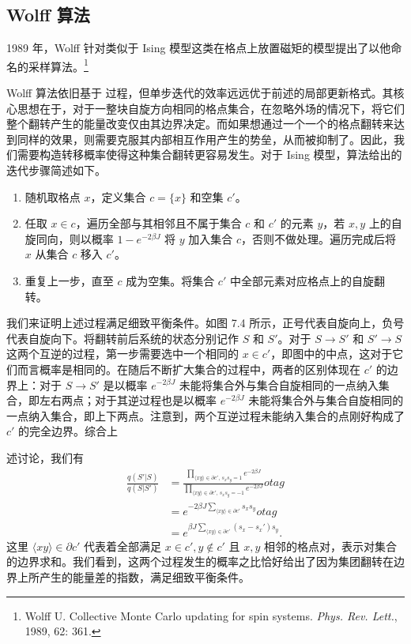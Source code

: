 \subsection{Wolff 算法}

1989 年，Wolff 针对类似于 Ising 模型这类在格点上放置磁矩的模型提出了以他命名的采样算法。\footnote{Wolff U. Collective Monte Carlo updating for spin systems. \emph{Phys. Rev. Lett.}, 1989, 62: 361.}

Wolff 算法依旧基于  过程，但单步迭代的效率远远优于前述的局部更新格式。其核心思想在于，对于一整块自旋方向相同的格点集合，在忽略外场的情况下，将它们整个翻转产生的能量改变仅由其边界决定。而如果想通过一个一个的格点翻转来达到同样的效果，则需要克服其内部相互作用产生的势垒，从而被抑制了。因此，我们需要构造转移概率使得这种集合翻转更容易发生。对于 Ising 模型，算法给出的迭代步骤简述如下。

\begin{algorithmBox}
\begin{enumerate}[label=\arabic*.,leftmargin=2em]
\item 随机取格点 $x$，定义集合 $c=\{x\}$ 和空集 $c'$。
\item 任取 $x\in c$，遍历全部与其相邻且不属于集合 $c$ 和 $c'$ 的元素 $y$，若 $x,y$ 上的自旋同向，则以概率 $1-e^{-2\beta J}$ 将 $y$ 加入集合 $c$，否则不做处理。遍历完成后将 $x$ 从集合 $c$ 移入 $c'$。
\item 重复上一步，直至 $c$ 成为空集。将集合 $c'$ 中全部元素对应格点上的自旋翻转。
\end{enumerate}
\end{algorithmBox}

我们来证明上述过程满足细致平衡条件。如图 7.4 所示，正号代表自旋向上，负号代表自旋向下。将翻转前后系统的状态分别记作 $S$ 和 $S'$。对于 $S\to S'$ 和 $S'\to S$ 这两个互逆的过程，第一步需要选中一个相同的 $x\in c'$，即图中的中点，这对于它们而言概率是相同的。在随后不断扩大集合的过程中，两者的区别体现在 $c'$ 的边界上：对于 $S\to S'$ 是以概率 $e^{-2\beta J}$ 未能将集合外与集合自旋相同的一点纳入集合，即左右两点；对于其逆过程也是以概率 $e^{-2\beta J}$ 未能将集合外与集合自旋相同的一点纳入集合，即上下两点。注意到，两个互逆过程未能纳入集合的点刚好构成了 $c'$ 的完全边界。综合上

述讨论，我们有
\begin{align}
 \frac{q(S'|S)}{q(S|S')}
 &=\frac{\displaystyle\prod_{\langle xy\rangle\in\partial c',\,s_xs_y=1}e^{-2\beta J}}
 {\displaystyle\prod_{\langle xy\rangle\in\partial c',\,s_xs_y=-1}e^{-2\beta J}}
otag\\
 &=e^{-2\beta J\sum_{\langle xy\rangle\in\partial c'}s_xs_y}
otag\\
 &=e^{\beta J\sum_{\langle xy\rangle\in\partial c'}(s_x-s_x')s_y}.
\tag{7.3.17}
\end{align}
这里 $\langle xy\rangle\in\partial c'$ 代表着全部满足 $x\in c',y\notin c'$ 且 $x,y$ 相邻的格点对，表示对集合的边界求和。我们看到，这两个过程发生的概率之比恰好给出了因为集团翻转在边界上所产生的能量差的指数，满足细致平衡条件。

